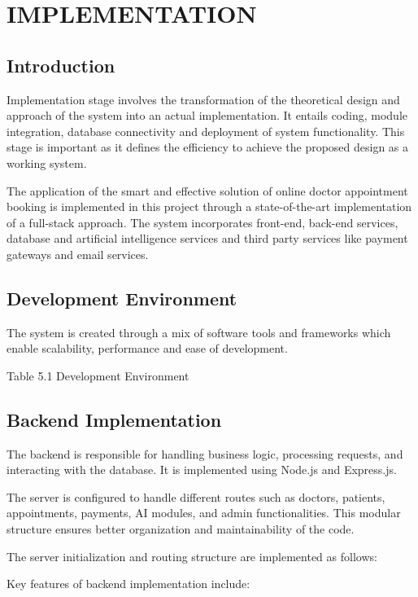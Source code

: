 \chapter{IMPLEMENTATION}

\section{Introduction}

Implementation stage involves the transformation of the theoretical design and approach of the system into an actual implementation. It entails coding, module integration, database connectivity and deployment of system functionality. This stage is important as it defines the efficiency to achieve the proposed design as a working system.

The application of the smart and effective solution of online doctor appointment booking is implemented in this project through a state-of-the-art implementation of a full-stack approach. The system incorporates front-end, back-end services, database and artificial intelligence services and third party services like payment gateways and email services.

\section{Development Environment}

The system is created through a mix of software tools and frameworks which enable scalability, performance and ease of development.

Table 5.1 Development Environment

\section{Backend Implementation}

The backend is responsible for handling business logic, processing requests, and interacting with the database. It is implemented using Node.js and Express.js.

The server is configured to handle different routes such as doctors, patients, appointments, payments, AI modules, and admin functionalities. This modular structure ensures better organization and maintainability of the code.

The server initialization and routing structure are implemented as follows:

Key features of backend implementation include:

